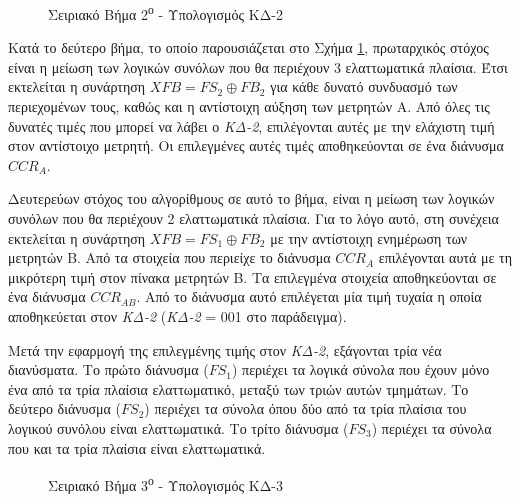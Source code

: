 \begin{figure}[!b]
    \centering
    \caption{Σειριακό Βήμα 2\textsuperscript{ο} - Υπολογισμός ΚΔ-2}
    \label{fig:chap5_serial_step2}
\end{figure}

Κατά το δεύτερο βήμα, το οποίο παρουσιάζεται στο Σχήμα \ref{fig:chap5_serial_step2}, πρωταρχικός στόχος είναι η μείωση των λογικών συνόλων που θα περιέχουν 3 ελαττωματικά πλαίσια. Έτσι εκτελείται η συνάρτηση $XFB = FS_{2} \oplus FB_{2}$ για κάθε δυνατό συνδυασμό των περιεχομένων τους, καθώς και η αντίστοιχη αύξηση των μετρητών Α. Από όλες τις δυνατές τιμές που μπορεί να λάβει ο \textit{ΚΔ-2}, επιλέγονται αυτές με την ελάχιστη τιμή στον αντίστοιχο μετρητή. Οι επιλεγμένες αυτές τιμές αποθηκεύονται σε ένα διάνυσμα $CCR_{A}$.
\par
Δευτερεύων στόχος του αλγορίθμους σε αυτό το βήμα, είναι η μείωση των λογικών συνόλων που θα περιέχουν 2 ελαττωματικά πλαίσια. Για το λόγο αυτό, στη συνέχεια εκτελείται η συνάρτηση $XFB = FS_{1} \oplus FB_{2}$ με την αντίστοιχη ενημέρωση των μετρητών Β. Από τα στοιχεία που περιείχε το διάνυσμα $CCR_{A}$ επιλέγονται αυτά με τη μικρότερη τιμή στον πίνακα μετρητών Β. Τα επιλεγμένα στοιχεία αποθηκεύονται σε ένα διάνυσμα $CCR_{AB}$. Από το διάνυσμα αυτό επιλέγεται μία τιμή τυχαία η οποία αποθηκεύεται στον \textit{ΚΔ-2} (\textit{ΚΔ-2} = 001 στο παράδειγμα).
\par
Μετά την εφαρμογή της επιλεγμένης τιμής στον \textit{ΚΔ-2}, εξάγονται τρία νέα διανύσματα. Το πρώτο διάνυσμα ($FS_{1}$) περιέχει τα λογικά σύνολα που έχουν μόνο ένα από τα τρία πλαίσια ελαττωματικό, μεταξύ των τριών αυτών τμημάτων. Το δεύτερο διάνυσμα ($FS_{2}$) περιέχει τα σύνολα όπου δύο από τα τρία πλαίσια του λογικού συνόλου είναι ελαττωματικά. Το τρίτο διάνυσμα ($FS_{3}$) περιέχει τα σύνολα που και τα τρία πλαίσια είναι ελαττωματικά.

\begin{figure}[!b]
    \centering
    \caption{Σειριακό Βήμα 3\textsuperscript{ο} - Υπολογισμός ΚΔ-3}
    \label{fig:chap5_serial_step3}
\end{figure}

